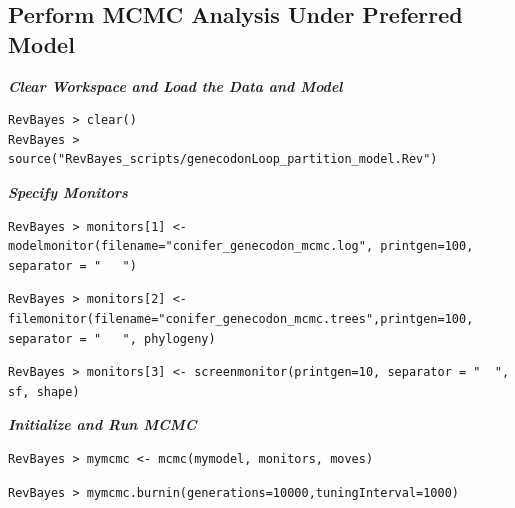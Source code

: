 \documentclass[11pt]{article}
\begin{document}
\bigskip
\subsection{Perform MCMC Analysis Under Preferred Model}

\textbf{\textit{Clear Workspace and Load the Data and Model}}


{\tt \begin{snugshade*}
\begin{lstlisting}
RevBayes > clear()
RevBayes > source("RevBayes_scripts/genecodonLoop_partition_model.Rev")
\end{lstlisting}
\end{snugshade*}}

\textbf{\textit{Specify Monitors}}

{\tt \begin{snugshade*}
\begin{lstlisting}
RevBayes > monitors[1] <- modelmonitor(filename="conifer_genecodon_mcmc.log", printgen=100, separator = "	")
\end{lstlisting}
\end{snugshade*}}

{\tt \begin{snugshade*}
\begin{lstlisting}
RevBayes > monitors[2] <- filemonitor(filename="conifer_genecodon_mcmc.trees",printgen=100, separator = "	", phylogeny)
\end{lstlisting}
\end{snugshade*}}

{\tt \begin{snugshade*}
\begin{lstlisting}
RevBayes > monitors[3] <- screenmonitor(printgen=10, separator = "	", sf, shape)
\end{lstlisting}
\end{snugshade*}}

\textbf{\textit{Initialize and Run MCMC}}

{\tt \begin{snugshade*}
\begin{lstlisting}
RevBayes > mymcmc <- mcmc(mymodel, monitors, moves)
\end{lstlisting}
\end{snugshade*}}

{\tt \begin{snugshade*}
\begin{lstlisting}
RevBayes > mymcmc.burnin(generations=10000,tuningInterval=1000)
\end{lstlisting}
\end{snugshade*}}
\end{document}
